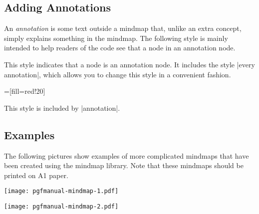 \subsection{Adding Annotations}

An \emph{annotation} is some text outside a mindmap that, unlike an
extra concept, simply explains something in the mindmap. The following
style is mainly intended to help readers of the code see that a node
in an annotation node.

\begin{itemize}
  This style indicates that a node is an annotation node. It includes
  the style |every annotation|, which allows you to change this style
  in a convenient fashion.
\begin{codeexample}[]
=[fill=red!20]    
\end{codeexample}
    This style is included by |annotation|.
\end{itemize}


\subsection{Examples}

The following pictures show examples of more complicated mindmaps that
have been created using the mindmap library. Note that these mindmaps
should be printed on A1 paper.

\medskip
\noindent
\texttt{[image: pgfmanual-mindmap-1.pdf]}

\medskip
\noindent
\texttt{[image: pgfmanual-mindmap-2.pdf]}



